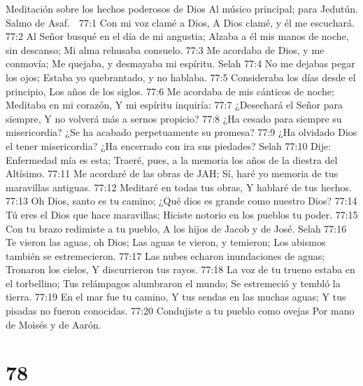 Meditación sobre los hechos poderosos de Dios 
Al músico principal; para Jedutún. Salmo de Asaf. 

77:1 Con mi voz clamé a Dios, 
A Dios clamé, y él me escuchará. 
77:2 Al Señor busqué en el día de mi angustia; 
Alzaba a él mis manos de noche, sin descanso; 
Mi alma rehusaba consuelo. 
77:3 Me acordaba de Dios, y me conmovía; 
Me quejaba, y desmayaba mi espíritu. Selah 
77:4 No me dejabas pegar los ojos; 
Estaba yo quebrantado, y no hablaba. 
77:5 Consideraba los días desde el principio, 
Los años de los siglos. 
77:6 Me acordaba de mis cánticos de noche; 
Meditaba en mi corazón, 
Y mi espíritu inquiría: 
77:7 ¿Desechará el Señor para siempre, 
Y no volverá más a sernos propicio? 
77:8 ¿Ha cesado para siempre su misericordia? 
¿Se ha acabado perpetuamente su promesa? 
77:9 ¿Ha olvidado Dios el tener misericordia? 
¿Ha encerrado con ira sus piedades? Selah 
77:10 Dije: Enfermedad mía es esta; 
Traeré, pues, a la memoria los años de la diestra del Altísimo. 
77:11 Me acordaré de las obras de JAH; 
Sí, haré yo memoria de tus maravillas antiguas. 
77:12 Meditaré en todas tus obras, 
Y hablaré de tus hechos. 
77:13 Oh Dios, santo es tu camino; 
¿Qué dios es grande como nuestro Dios? 
77:14 Tú eres el Dios que hace maravillas; 
Hiciste notorio en los pueblos tu poder. 
77:15 Con tu brazo redimiste a tu pueblo, 
A los hijos de Jacob y de José. Selah 
77:16 Te vieron las aguas, oh Dios; 
Las aguas te vieron, y temieron; 
Los abismos también se estremecieron. 
77:17 Las nubes echaron inundaciones de aguas; 
Tronaron los cielos, 
Y discurrieron tus rayos. 
77:18 La voz de tu trueno estaba en el torbellino; 
Tus relámpagos alumbraron el mundo; 
Se estremeció y tembló la tierra. 
77:19 En el mar fue tu camino, 
Y tus sendas en las muchas aguas; 
Y tus pisadas no fueron conocidas. 
77:20 Condujiste a tu pueblo como ovejas 
Por mano de Moisés y de Aarón. 

\chapter{78}

